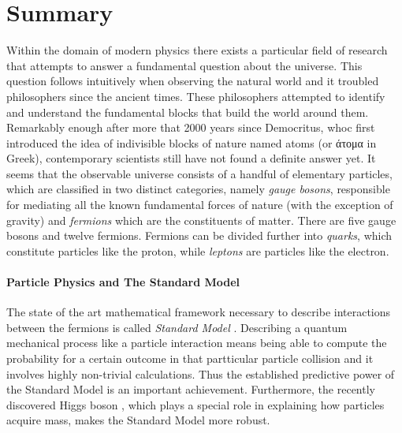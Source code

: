 \chapter*{Summary}
\chaptermark{}
%

Within the domain of modern physics there exists a particular field of research
that attempts to answer a fundamental question about the universe. This
question follows intuitively when observing the natural world and it troubled
philosophers since the ancient times. These philosophers attempted to identify
and understand the fundamental blocks that build the world around them.
Remarkably enough after more that 2000 years since Democritus, whoc first
introduced the idea of indivisible blocks of nature named atoms (or \textgreek{άτομα} in Greek),
contemporary scientists still have not found a definite answer yet.
It seems that the observable universe consists of a handful of elementary particles,
which are classified in two distinct categories, namely {\it gauge bosons},
responsible for mediating all the known fundamental forces of nature (with the
exception of gravity) and {\it fermions} which are the constituents of matter.
There are five gauge bosons and twelve fermions. Fermions can be divided further into
{\it quarks}, which constitute particles like the proton, while {\it leptons}
are particles like the electron.

\subsubsection{Particle Physics and The Standard Model}
The state of the art mathematical framework necessary to describe interactions between the
fermions is called \textit{Standard Model} \cite{sm-glashow,sm-weinberg,sm-salam}.
Describing a quantum mechanical process like a particle interaction means being able
to compute the probability for a certain outcome in that partticular particle collision
and it involves highly non-trivial calculations. Thus the established predictive power of
the Standard Model is an important achievement. Furthermore, the recently
discovered Higgs boson \cite{higgs-cms,higgs-atlas}, which plays a special role in
explaining how particles acquire mass, makes the Standard Model more robust.

